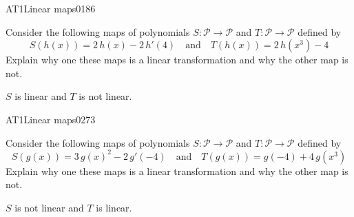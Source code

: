 \newpage




\begin{exercise}{AT1}{Linear maps}{0186} 
\begin{exerciseStatement} 

 Consider the following maps of polynomials \(S:\mathcal{P}\rightarrow\mathcal{P}\) and \(T:\mathcal{P}\rightarrow\mathcal{P}\) defined by \[
            S(h(x))=
                    2 \, h\left(x\right) - 2 \, h'\left(4\right)
                \hspace{1em} \text{and} \hspace{1em}
            T(h(x))=
                    2 \, h\left(x^{3}\right) - 4
        \] Explain why one these maps is a linear transformation and why the other map is not. 

 \end{exerciseStatement}
 \begin{exerciseAnswer} 

\(S\) is linear and \(T\) is not linear.

 \end{exerciseAnswer}
 \end{exercise}



\begin{exercise}{AT1}{Linear maps}{0273} 
\begin{exerciseStatement} 

 Consider the following maps of polynomials \(S:\mathcal{P}\rightarrow\mathcal{P}\) and \(T:\mathcal{P}\rightarrow\mathcal{P}\) defined by \[
            S(g(x))=
                    3 \, g\left(x\right)^{2} - 2 \, g'\left(-4\right)
                \hspace{1em} \text{and} \hspace{1em}
            T(g(x))=
                    g\left(-4\right) + 4 \, g\left(x^{3}\right)
        \] Explain why one these maps is a linear transformation and why the other map is not. 

 \end{exerciseStatement}
 \begin{exerciseAnswer} 

\(S\) is not linear and \(T\) is linear.

 \end{exerciseAnswer}
 \end{exercise}


\newpage




